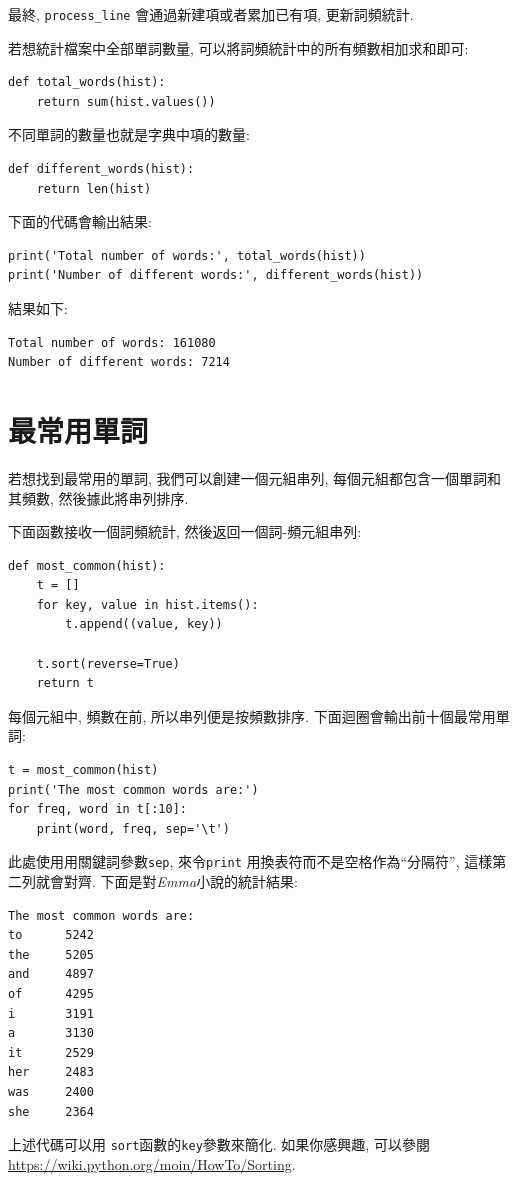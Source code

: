 \documentclass[10pt]{book}
\begin{document}
最終, \verb"process_line" 會通過新建項或者累加已有項, 更新詞頻統計.

若想統計檔案中全部單詞數量, 可以將詞頻統計中的所有頻數相加求和即可:

\begin{verbatim}
def total_words(hist):
    return sum(hist.values())
\end{verbatim}
%
不同單詞的數量也就是字典中項的數量:

\begin{verbatim}
def different_words(hist):
    return len(hist)
\end{verbatim}
%
下面的代碼會輸出結果:

\begin{verbatim}
print('Total number of words:', total_words(hist))
print('Number of different words:', different_words(hist))
\end{verbatim}
%
結果如下:

\begin{verbatim}
Total number of words: 161080
Number of different words: 7214
\end{verbatim}
%

\section{最常用單詞}

若想找到最常用的單詞, 我們可以創建一個元組串列, 
每個元組都包含一個單詞和其頻數, 然後據此將串列排序.

下面函數接收一個詞頻統計, 然後返回一個詞-頻元組串列:

\begin{verbatim}
def most_common(hist):
    t = []
    for key, value in hist.items():
        t.append((value, key))

    t.sort(reverse=True)
    return t
\end{verbatim}

每個元組中, 頻數在前, 所以串列便是按頻數排序. 
下面迴圈會輸出前十個最常用單詞:

\begin{verbatim}
t = most_common(hist)
print('The most common words are:')
for freq, word in t[:10]:
    print(word, freq, sep='\t')
\end{verbatim}
%
此處使用用關鍵詞參數{\tt sep}, 來令{\tt print} 用換表符而不是空格作為``分隔符'', 
這樣第二列就會對齊.  下面是對{\em Emma}小說的統計結果:

\begin{verbatim}
The most common words are:
to      5242
the     5205
and     4897
of      4295
i       3191
a       3130
it      2529
her     2483
was     2400
she     2364
\end{verbatim}
%
上述代碼可以用 {\tt sort}函數的{\tt key}參數來簡化. 
如果你感興趣, 可以參閱 \url{https://wiki.python.org/moin/HowTo/Sorting}.
\end{document}

